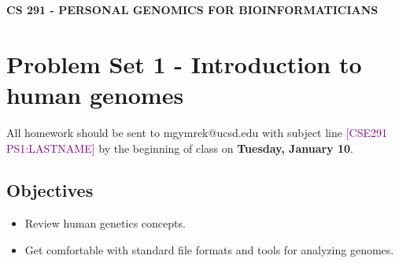 \documentclass[12pt]{article}
\begin{document}
\textbf{CS 291 - PERSONAL GENOMICS FOR BIOINFORMATICIANS}

\section*{Problem Set 1 - Introduction to human genomes}

All homework should be sent to mgymrek@ucsd.edu with subject line \textcolor{purple}{[CSE291 PS1:LASTNAME]} by the beginning of class on \textbf{Tuesday, January 10}.

\subsection*{Objectives}
\begin{itemize}
\item Review human genetics concepts.
\item Get comfortable with standard file formats and tools for analyzing genomes.
\end{itemize}

\end{document}
